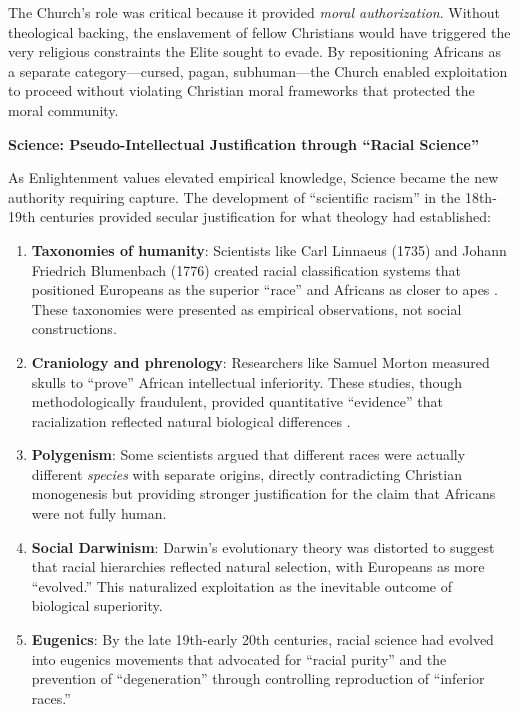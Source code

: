 \documentclass[12pt,openany]{book}
\begin{document}
The Church's role was critical because it provided \textit{moral authorization}. Without theological backing, the enslavement of fellow Christians would have triggered the very religious constraints the Elite sought to evade. By repositioning Africans as a separate category---cursed, pagan, subhuman---the Church enabled exploitation to proceed without violating Christian moral frameworks that protected the moral community.

\textbf{Science: Pseudo-Intellectual Justification through ``Racial Science''}

As Enlightenment values elevated empirical knowledge, Science became the new authority requiring capture. The development of ``scientific racism'' in the 18th-19th centuries provided secular justification for what theology had established:

\begin{enumerate}
    \item \textbf{Taxonomies of humanity}: Scientists like Carl Linnaeus (1735) and Johann Friedrich Blumenbach (1776) created racial classification systems that positioned Europeans as the superior ``race'' and Africans as closer to apes \cite{gould}. These taxonomies were presented as empirical observations, not social constructions.
    
    \item \textbf{Craniology and phrenology}: Researchers like Samuel Morton measured skulls to ``prove'' African intellectual inferiority. These studies, though methodologically fraudulent, provided quantitative ``evidence'' that racialization reflected natural biological differences \cite{gould}.
    
    \item \textbf{Polygenism}: Some scientists argued that different races were actually different \textit{species} with separate origins, directly contradicting Christian mono\-genesis but providing stronger justification for the claim that Africans were not fully human.
    
    \item \textbf{Social Darwinism}: Darwin's evolutionary theory was distorted to suggest that racial hierarchies reflected natural selection, with Europeans as more ``evolved.'' This naturalized exploitation as the inevitable outcome of biological superiority.
    
    \item \textbf{Eugenics}: By the late 19th-early 20th centuries, racial science had evolved into eugenics movements that advocated for ``racial purity'' and the prevention of ``degeneration'' through controlling reproduction of ``inferior races.''
\end{enumerate}
\end{document}
